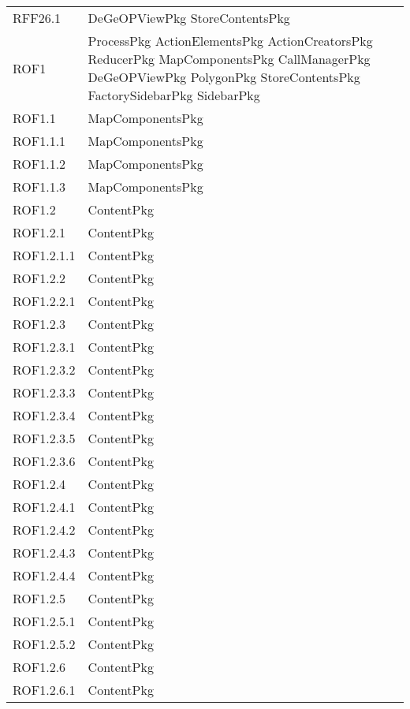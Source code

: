 \begin{longtable}{p{2.5cm}!{\VRule[1pt]}p{5cm}}
		RFF26.1 & DeGeOPViewPkg \newline StoreContentsPkg\\
		ROF1 & ProcessPkg \newline ActionElementsPkg \newline ActionCreatorsPkg \newline ReducerPkg \newline MapComponentsPkg \newline CallManagerPkg \newline DeGeOPViewPkg \newline PolygonPkg \newline StoreContentsPkg \newline FactorySidebarPkg \newline SidebarPkg\\
		ROF1.1 & MapComponentsPkg\\
		ROF1.1.1 & MapComponentsPkg\\
		ROF1.1.2 & MapComponentsPkg\\
		ROF1.1.3 & MapComponentsPkg\\
		ROF1.2 & ContentPkg\\
		ROF1.2.1 & ContentPkg\\
		ROF1.2.1.1 & ContentPkg\\
		ROF1.2.2 & ContentPkg\\
		ROF1.2.2.1 & ContentPkg\\
		ROF1.2.3 & ContentPkg\\
		ROF1.2.3.1 & ContentPkg\\
		ROF1.2.3.2 & ContentPkg\\
		ROF1.2.3.3 & ContentPkg\\
		ROF1.2.3.4 & ContentPkg\\
		ROF1.2.3.5 & ContentPkg\\
		ROF1.2.3.6 & ContentPkg\\
		ROF1.2.4 & ContentPkg\\
		ROF1.2.4.1 & ContentPkg\\
		ROF1.2.4.2 & ContentPkg\\
		ROF1.2.4.3 & ContentPkg\\
		ROF1.2.4.4 & ContentPkg\\
		ROF1.2.5 & ContentPkg\\
		ROF1.2.5.1 & ContentPkg\\
		ROF1.2.5.2 & ContentPkg\\
		ROF1.2.6 & ContentPkg\\
		ROF1.2.6.1 & ContentPkg\\

\end{longtable}
